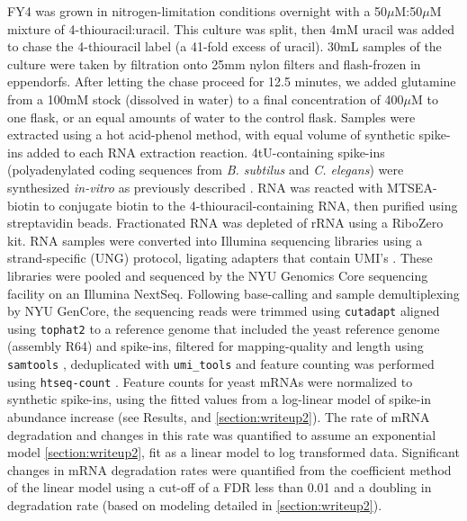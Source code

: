 {FY4 was grown in nitrogen-limitation conditions overnight 
with a 50$\mu$M:50$\mu$M mixture of 4-thiouracil:uracil.
This culture was split, then 4mM uracil was added to chase the
4-thiouracil label (a 41-fold excess of uracil).
30mL samples of the culture were taken by filtration onto 25mm
nylon filters and flash-frozen in eppendorfs. 
After letting the chase proceed for 12.5 minutes, 
we added glutamine from 
a 100mM stock (dissolved in water) to a final concentration 
of 400$\mu$M to one flask, or an equal amounts of water to the 
control flask. 
Samples were extracted using a hot acid-phenol method,
with equal volume of synthetic spike-ins  added to each RNA 
extraction reaction.
4tU-containing spike-ins (polyadenylated coding sequences from
\textit{B. subtilus} and \textit{C. elegans}) were synthesized
\textit{in-vitro} as previously described
\parencite{neymotin2014determination}. 
RNA was reacted with 
MTSEA-biotin to conjugate biotin to the 4-thiouracil-containing
RNA, then purified using streptavidin beads.
Fractionated RNA was depleted of rRNA using a RiboZero kit.
RNA samples were converted into Illumina sequencing libraries using
a strand-specific (UNG) protocol, ligating adapters that contain
UMI's \parencite{hong2017method}.
These libraries were pooled and sequenced by the NYU Genomics
Core sequencing facility on an Illumina NextSeq.
Following base-calling and sample demultiplexing by NYU GenCore,
the sequencing reads were trimmed using 
\texttt{cutadapt} \parencite{martin2011cutadapt}
aligned using \texttt{tophat2} \parencite{kim2013tophat2} to a reference genome
that included the yeast reference genome (assembly R64) and
spike-ins, filtered for mapping-quality and length using
\texttt{samtools} \parencite{li2009sequence}, deduplicated 
with \texttt{umi\_tools} \parencite{smith2017umi}
and feature counting was performed using 
\texttt{htseq-count} \parencite{anders2015htseq}.
Feature counts for yeast mRNAs were normalized to synthetic spike-ins, 
using the fitted values from a log-linear model of spike-in abundance
increase (see Results, and \autoref{section:writeup2}).
The rate of mRNA degradation and changes in this rate
was quantified to assume an exponential model 
\autoref{section:writeup2}, fit as a linear model to log 
transformed data.
Significant changes in mRNA degradation rates were quantified from
the coefficient method of the linear model using a cut-off of a FDR 
\parencite{storey2015qvalue} less than 0.01 and a doubling in degradation
rate (based on modeling detailed in \autoref{section:writeup2}).

}
